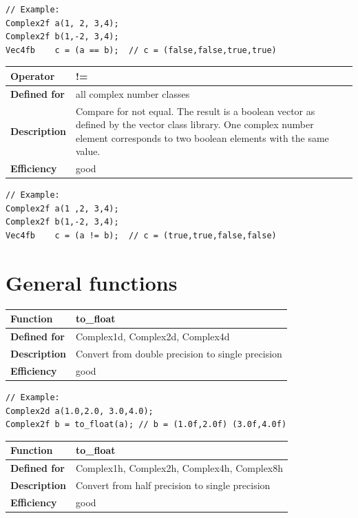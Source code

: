 \documentclass[11pt,a4paper,oneside,openright]{report}
\newcommand{\vspacesmall}{\vspace{3mm}}
\newcommand{\vspacebig}{\vspace{6mm}}
\begin{document}
\begin{lstlisting}[frame=none]
// Example:
Complex2f a(1, 2, 3,4);
Complex2f b(1,-2, 3,4);
Vec4fb    c = (a == b);  // c = (false,false,true,true)
\end{lstlisting}
\vspacebig


\begin{tabular}{|p{25mm}|p{100mm}|}
\hline
\bfseries Operator & != \\ \hline
\bfseries Defined for & all complex number classes  \\ \hline
\bfseries Description & Compare for not equal.\newline
The result is a boolean vector as defined by the vector class library.\newline
One complex number element corresponds to two boolean elements with the same value. \\ \hline
\bfseries Efficiency & good \\ \hline
\end{tabular}
\vspacesmall

\begin{lstlisting}[frame=none]
// Example:
Complex2f a(1 ,2, 3,4);
Complex2f b(1,-2, 3,4);
Vec4fb    c = (a != b);  // c = (true,true,false,false)
\end{lstlisting}
\vspacebig


\chapter{General functions}\label{chap:GeneralFunctions}

\begin{tabular}{|p{25mm}|p{100mm}|}
\hline
\bfseries Function & to\_float \\ \hline
\bfseries Defined for & Complex1d, Complex2d, Complex4d  \\ \hline
\bfseries Description & Convert from double precision to single precision \\ \hline
\bfseries Efficiency & good \\ \hline
\end{tabular}
\vspacesmall

\begin{lstlisting}[frame=none]
// Example:
Complex2d a(1.0,2.0, 3.0,4.0);
Complex2f b = to_float(a); // b = (1.0f,2.0f) (3.0f,4.0f)
\end{lstlisting}
\vspacebig

\begin{tabular}{|p{25mm}|p{100mm}|}
\hline
\bfseries Function & to\_float \\ \hline
\bfseries Defined for & Complex1h, Complex2h, Complex4h, Complex8h  \\ \hline
\bfseries Description & Convert from half precision to single precision \\ \hline
\bfseries Efficiency & good \\ \hline
\end{tabular}
\vspacesmall
\end{document}
